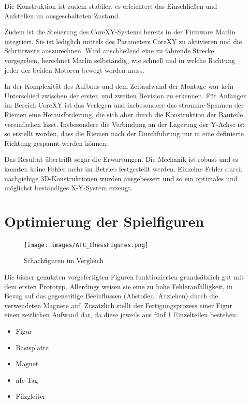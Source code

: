 Die Konstruktion ist zudem stabiler, es erleichtert das Einschließen und
Aufstellen im ausgeschalteten Zustand.

Zudem ist die Steuerung des CoreXY-Systems bereits in der Firmware
Marlin integriert. Sie ist lediglich mittels des Parameters CoreXY zu
aktivieren und die Schrittweite auszurechnen. Wird anschließend eine zu
fahrende Strecke vorgegeben, berechnet Marlin selbständig, wie schnell
und in welche Richtung jeder der beiden Motoren bewegt werden muss.

In der Komplexität des Aufbaus und dem Zeitaufwand der Montage war kein
Unterschied zwischen der ersten und zweiten Revision zu erkennen. Für
Anfänger im Bereich CoreXY ist das Verlegen und insbesondere das stramme
Spannen der Riemen eine Herausforderung, die sich aber durch die
Konstruktion der Bauteile vereinfachen lässt. Insbesondere die
Verbindung an der Lagerung der Y-Achse ist so erstellt worden, dass die
Riemen nach der Durchführung nur in eine definierte Richtung gespannt
werden können.

Das Resultat übertrifft sogar die Erwartungen. Die Mechanik ist robust
und es konnten keine Fehler mehr im Betrieb festgestellt werden.
Einzelne Fehler durch nachgiebige 3D-Konstruktionen wurden ausgebessert
und so ein optimales und möglichst beständiges X-Y-System erzeugt.

\hypertarget{optimierung-der-spielfiguren}{%
\section{Optimierung der
Spielfiguren}\label{optimierung-der-spielfiguren}}

\begin{figure}
\centering
\texttt{[image: images/ATC\_ChessFigures.png]}
\caption{Schachfiguren im Vergleich \label{ATC_ChessFigures}}
\end{figure}

Die bisher genutzten vorgefertigten Figuren funktionierten grundsätzlich
gut mit dem ersten Prototyp. Allerdings weisen sie eine zu hohe
Fehleranfälligkeit, in Bezug auf das gegenseitige Beeinflussen
(Abstoßen, Anziehen) durch die verwendeten Magnete auf. Zusätzlich
stellt der Fertigungsprozess einer Figur einen zeitlichen Aufwand dar,
da diese jeweils aus fünf \ref{ATC_ChessFigures} Einzelteilen bestehen:

\begin{itemize}
\tightlist
\item
  Figur
\item
  Basisplatte
\item
  Magnet
\item
  \gls{nfc} Tag
\item
  Filzgleiter
\end{itemize}

